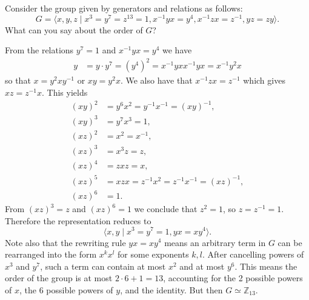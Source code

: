 \documentclass{article}
\newcounter{Problem}
\newenvironment{Problem}{\begin{Exercise}[name={Problem},
                                          counter={Problem}]}
                        {\end{Exercise}}
\begin{document}
\begin{Problem}
Consider the group given by generators and relations as follows:
$$
G = \langle
      x, y, z
    \mid
      x^3 = y^7 = z^{13} = 1,
      x^{-1} y x = y^4,
      x^{-1} z x = z^{-1},
      yz = zy
    \rangle.
$$
What can you say about the order of $G$?
\end{Problem}

\begin{Answer}
From the relations $y^7 = 1$ and $x^{-1} y x = y^4$ we have
\begin{align*}
   y
&= y \cdot y^7
 = (y^4)^2
 = x^{-1} y x x^{-1} y x
 = x^{-1} y^2 x
\end{align*}
so that $x = y^2 x y^{-1}$ or $xy = y^2 x$.
We also have that $x^{-1}zx = z^{-1}$ which gives
$xz = z^{-1}x$. This yields
\begin{align*}
(xy)^2 &= y^6 x^2 = y^{-1} x^{-1} = (xy)^{-1}, \\
(xy)^3 &= y^7 x^3 = 1, \\
(xz)^2 &= x^2 = x^{-1}, \\
(xz)^3 &= x^3z = z, \\
(xz)^4 &= zxz = x, \\
(xz)^5 &= xzx = z^{-1} x^2 = z^{-1} x^{-1} = (xz)^{-1}, \\
(xz)^6 &= 1.
\end{align*}
From $(xz)^3 = z$ and $(xz)^6 = 1$ we conclude that $z^2 = 1$, so
$z = z^{-1} = 1$. Therefore the representation reduces to
$$
\langle x, y \mid x^3 = y^7 = 1, yx = xy^4 \rangle.
$$
Note also that the rewriting rule $yx = xy^4$ means an arbitrary term
in $G$ can be rearranged into the form $x^k x^l$ for some exponents
$k, l$. After cancelling powers of
$x^3$ and $y^7$, such a term can contain at most $x^2$ and at most
$y^6$. This means the order of the group is at most $2 \cdot 6 + 1 = 13$,
accounting for the 2 possible powers of $x$, the 6 possible powers of
$y$, and the identity. But then $G \simeq \mathbb{Z}_{13}$.
\end{Answer}

\pagebreak
\end{document}
